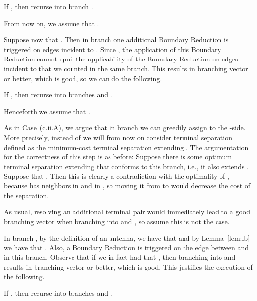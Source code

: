 \begin{reductionstep}
If , then recurse into branch .
\end{reductionstep}

From now on, we assume that .

Suppose now that . Then in branch  one additional Boundary Reduction is triggered on edges incident to . Since , the application of this Boundary Reduction cannot spoil the applicability of the Boundary Reduction on edges incident to  that we counted in the same branch. This results in branching vector  or better, which is good, so we can do the following.

\begin{branching}
If , then recurse into branches  and .
\end{branching}

Henceforth we assume that .


\newcommand{\Aext}{A^{\textrm{ext}}_{tt'\to A}}
\newcommand{\Bext}{B^{\textrm{ext}}_{tt'\to A}}

As in Case~(c.ii.A), we argue that in branch  we can greedily assign  to the -side. More precisely, instead of  we will from now on consider terminal separation  defined as the minimum-cost terminal separation extending . The argumentation for the correctness of this step is as before: Suppose there is some optimum terminal separation  extending  that conforms to this branch, i.e., it also extends . Suppose that . Then this is clearly a contradiction with the optimality of , because  has  neighbors in  and  in , so moving it from  to  would decrease the cost of the separation. 

As usual,  resolving an additional terminal pair would immediately lead to a good branching vector when branching into  and , so assume this is not the case.

In branch , by the definition of an antenna, we have that  and by Lemma~\ref{lem:lb} we have that . Also, a Boundary Reduction is triggered on the edge between  and  in this branch. Observe that if we in fact had that , then branching into  and  results in branching vector  or better, which is good. This justifies the execution of the following.

\begin{branching}
If , then recurse into branches  and .
\end{branching}

